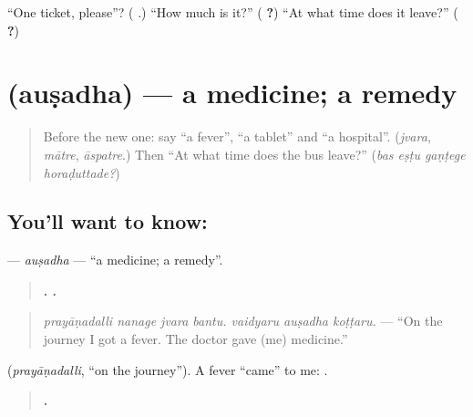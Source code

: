 \begin{tcolorbox}[breakable,colback=teal!4,colframe=teal!35!black,title={Before you move on}]
\textquotedblleft{}One ticket, please\textquotedblright{}? (\textbf{  }.) \textquotedblleft{}How much is it?\textquotedblright{} (\textbf{ ?}) \textquotedblleft{}At what time does it leave?\textquotedblright{} (\textbf{  ?})
\end{tcolorbox}
\section[\texorpdfstring{\kn{ಔಷಧ} (auṣadha)}{ಔಷಧ (auṣadha)}]{ (auṣadha) — a medicine; a remedy}

\label{lesson:KA-C314-ausadha}



\begin{quote}
Before the new one: say \textquotedblleft{}a fever\textquotedblright{}, \textquotedblleft{}a tablet\textquotedblright{} and \textquotedblleft{}a hospital\textquotedblright{}. (\emph{jvara}, \emph{mātre}, \emph{āspatre}.) Then \textquotedblleft{}At what time does the bus leave?\textquotedblright{} (\emph{bas eṣṭu gaṇṭege horaḍuttade?})
\end{quote}

\subsection*{You'll want to know: }
\textbf{} — \emph{auṣadha} — \textquotedblleft{}a medicine; a remedy\textquotedblright{}.

\begin{quote}
\textbf{   .   .}
\end{quote}

\begin{quote}
\emph{prayāṇadalli nanage jvara bantu. vaidyaru auṣadha koṭṭaru.} — \textquotedblleft{}On the journey I got a fever. The doctor gave (me) medicine.\textquotedblright{}
\end{quote}

\textbf{} (\emph{prayāṇadalli}, \textquotedblleft{}on the journey\textquotedblright{}). A fever \textquotedblleft{}came\textquotedblright{} to me: \textbf{  }.

\begin{quote}
\textbf{     .}
\end{quote}

